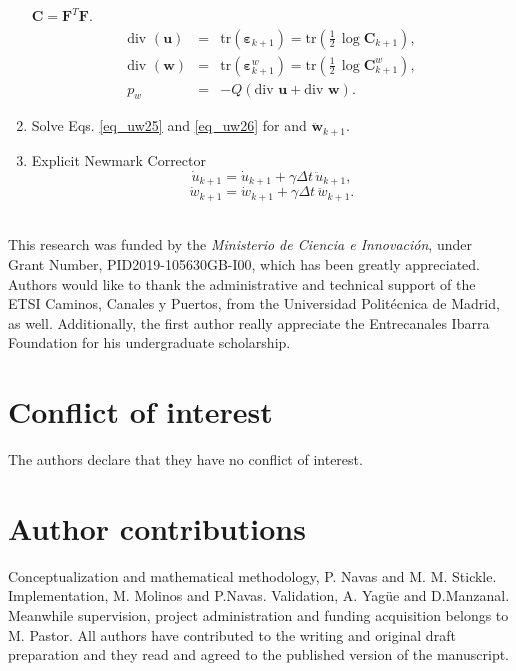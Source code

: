 \documentclass[twocolumn]{svjour3}          %
\begin{document}
\begin{enumerate}
 $\mathbf{C}=\mathbf{F}^T\mathbf{F}$.
\begin{eqnarray*}
\mbox{div }(\boldsymbol{u}) &=& \mbox{tr}(\boldsymbol{\varepsilon}_{k+1})=\mbox{tr} \left (\frac{1}{2}\,\log\mathbf{C}_{k+1} \right), \\
\mbox{div }(\boldsymbol{w}) &=& \mbox{tr} (\boldsymbol{\varepsilon}^w_{k+1})=\mbox{tr} \left(\frac{1}{2}\,\log\mathbf{C}^w_{k+1} \right), \\
p_w&=&-Q \left( \mbox{div } \boldsymbol{u} + \mbox{div } \boldsymbol{w} \right).
\end{eqnarray*}
\item Solve Eqs. \ref{eq_uw25} and \ref{eq_uw26} for and $\boldsymbol{\ddot{w}}_{k+1}$.
\item Explicit Newmark Corrector
$$
\dot{u}_{k+1}=\dot{u}_{k+1}+\gamma \Delta t \, \ddot{u}_{k+1},
$$
$$
\dot{w}_{k+1}=\dot{w}_{k+1}+\gamma \Delta t \, \ddot{w}_{k+1}.
$$\\
\end{enumerate}


\begin{acknowledgements}
This research was funded by the \textit{Ministerio de Ciencia e Innovaci\'on}, under Grant Number, PID2019-105630GB-I00, which has been greatly appreciated. Authors would like to thank the administrative and technical support of the ETSI Caminos, Canales y Puertos, from the Universidad Polit\'ecnica de Madrid, as well. Additionally, the first author really appreciate the Entrecanales Ibarra Foundation for his undergraduate scholarship.
\end{acknowledgements}


%
\section*{Conflict of interest}
The authors declare that they have no conflict of interest.

\section*{Author contributions}
Conceptualization and mathematical methodology, P. Navas and M. M. Stickle. Implementation, M. Molinos and P.Navas. Validation, A. Yag\"ue and D.Manzanal. Meanwhile supervision, project administration and funding acquisition belongs to M. Pastor. All authors have contributed to the writing and original draft preparation and they read and agreed to the published version of the manuscript.
\end{document}
